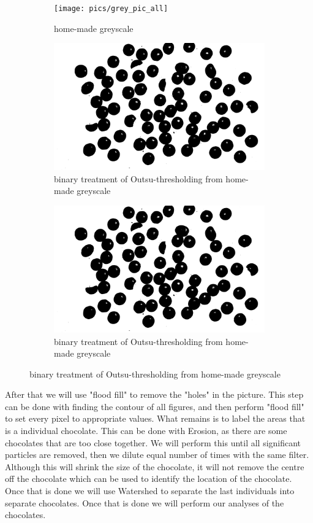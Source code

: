 \documentclass{article}
\begin{document}
\begin{figure}[H]
\begin{subfigure}{0.5\textwidth}
\centering
\texttt{[image: pics/grey\_pic\_all]}
\caption{home-made greyscale}
\label{fig:greypicall}
\end{subfigure}
\begin{subfigure}{0.5\textwidth}
\centering
\includegraphics[width=0.7\linewidth]{pics/grey_pic_all_bin_grad}
\caption{binary treatment of Outsu-thresholding from home-made greyscale}
\label{fig:greypic2}
\end{subfigure}
\newline
\begin{subfigure}{\textwidth}
\centering
\includegraphics[width=0.7\linewidth]{pics/grey_pic_all_bin_grad}
\caption{binary treatment of Outsu-thresholding from home-made greyscale}
\label{fig:greypicallbingrad}
\end{subfigure}
\end{figure}

After that we will use "flood fill" to remove the "holes" in the picture. This step can be done with finding the contour of all figures, and then perform "flood fill" to set every pixel to appropriate values. 
What remains is to label the areas that is a individual chocolate. This can be done with Erosion, as there are some chocolates that are too close together. We will perform this until all significant particles are removed, then we dilute equal number of times with the same filter. Although this will shrink the size of the chocolate, it will not remove the centre off the chocolate which can be used to identify the location of the chocolate. Once that is done we will use Watershed to separate the last individuals into separate chocolates. Once that is done we will perform our analyses of the chocolates.
\end{document}
